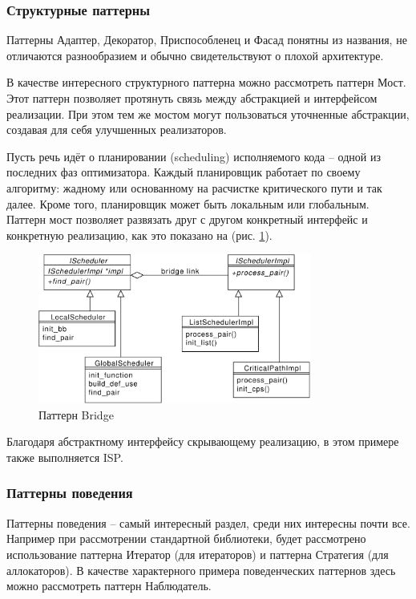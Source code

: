 \documentclass[a4paper,12pt,oneside]{article}
\begin{document}
\subsubsection{Структурные паттерны}

Паттерны Адаптер, Декоратор, Приспособленец и Фасад понятны из названия, не отличаются разнообразием и обычно свидетельствуют о плохой архитектуре.

В качестве интересного структурного паттерна можно рассмотреть паттерн Мост. Этот паттерн позволяет протянуть связь между абстракцией и интерфейсом реализации. При этом тем же мостом могут пользоваться уточненные абстракции, создавая для себя улучшенных реализаторов.

Пусть речь идёт о планировании (scheduling) исполняемого кода -- одной из последних фаз оптимизатора. Каждый планировщик работает по своему алгоритму: жадному или основанному на расчистке критического пути и так далее. Кроме того, планировщик может быть локальным или глобальным. Паттерн мост позволяет развязать друг с другом конкретный интерфейс и конкретную реализацию, как это показано на (рис. \ref{fig:bridge_pattern}).

\begin{figure}[h!]
\centering
\includegraphics[width=0.8\textwidth]{illustrations/sched-bridge-crop.pdf}
\caption{Паттерн Bridge}
\label{fig:bridge_pattern}
\end{figure}

Благодаря абстрактному интерфейсу скрывающему реализацию, в этом примере также выполняется ISP.

\subsubsection{Паттерны поведения}

Паттерны поведения -- самый интересный раздел, среди них интересны почти все. Например при рассмотрении стандартной библиотеки, будет рассмотрено использование паттерна Итератор (для итераторов) и паттерна Стратегия (для аллокаторов). В качестве характерного примера поведенческих паттернов здесь можно рассмотреть паттерн Наблюдатель.
\end{document}
